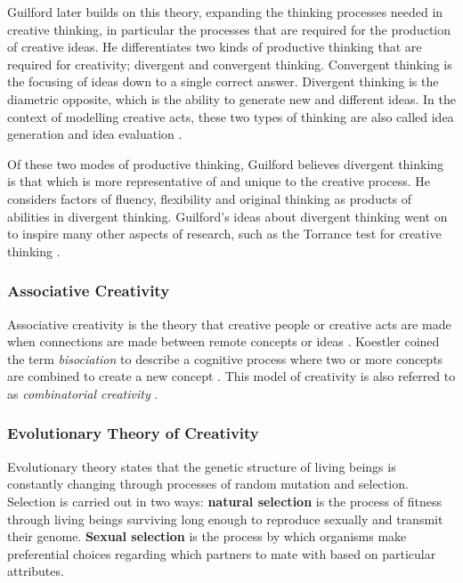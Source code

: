 Guilford later builds on this theory, expanding the thinking processes needed in creative thinking, in particular the processes that are required for the production of creative ideas.
He differentiates two kinds of productive thinking that are required for creativity; divergent and convergent thinking. 
Convergent thinking is the focusing of ideas down to a single correct answer. 
Divergent thinking is the diametric opposite, which is the ability to generate new and different ideas. 
In the context of modelling creative acts, these two types of thinking are also called idea generation and idea evaluation \citep{guilford1957creative}.

Of these two modes of productive thinking, Guilford believes divergent thinking is that which is more representative of and unique to the creative process. 
He considers factors of fluency, flexibility and original thinking as products of abilities in divergent thinking.
Guilford's ideas about divergent thinking went on to inspire many other aspects of research, such as the Torrance test for creative thinking \citep{torrance1966torrance}.

\subsubsection{Associative Creativity}

Associative creativity is the theory that creative people or creative acts are made when connections are made between remote concepts or ideas \citep{mednick1962associative}. 
Koestler coined the term \textit{bisociation} to describe a cognitive process where two or more concepts are combined to create a new concept \citep{koestler1964act}.
This model of creativity is also referred to as \textit{combinatorial creativity} \citep{boden2004creative}.

\subsubsection{Evolutionary Theory of Creativity}

Evolutionary theory states that the genetic structure of living beings is constantly changing through processes of random mutation and selection. Selection is carried out in two ways: \textbf{natural selection} is the process of fitness through living beings surviving long enough to reproduce sexually and transmit their genome. \textbf{Sexual selection} is the process by which organisms make preferential choices regarding which partners to mate with based on particular attributes.

